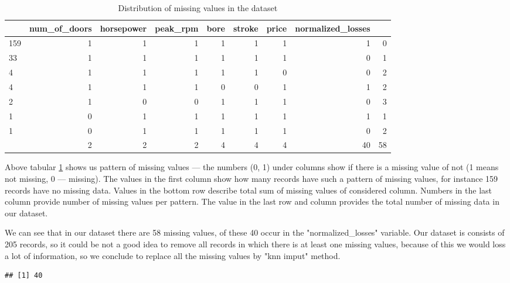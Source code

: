 \documentclass[11pt,a4paper]{article}\usepackage[]{graphicx}\usepackage[]{xcolor}
\makeatletter
\newenvironment{kframe}{%
 \def\at@end@of@kframe{}%
 \ifinner\ifhmode%
  \def\at@end@of@kframe{\end{minipage}}%
  \begin{minipage}{\columnwidth}%
 \fi\fi%
 \def\FrameCommand##1{\hskip\@totalleftmargin \hskip-\fboxsep
 \colorbox{shadecolor}{##1}\hskip-\fboxsep
     \hskip-\linewidth \hskip-\@totalleftmargin \hskip\columnwidth}%
 \MakeFramed {\advance\hsize-\width
   \@totalleftmargin\z@ \linewidth\hsize
   \@setminipage}}%
 {\par\unskip\endMakeFramed%
 \at@end@of@kframe}
\newenvironment{knitrout}{}{} %
\makeatother
\begin{document}
\begin{knitrout}
\color{fgcolor}\begin{table}

\caption{\label{tab:missing_value_distribution}Distribution of missing values in the dataset}
\centering
\begin{tabular}[t]{l|r|r|r|r|r|r|r|r}
\hline
  & num\_of\_doors & horsepower & peak\_rpm & bore & stroke & price & normalized\_losses & \\
\hline
159 & 1 & 1 & 1 & 1 & 1 & 1 & 1 & 0\\
\hline
33 & 1 & 1 & 1 & 1 & 1 & 1 & 0 & 1\\
\hline
4 & 1 & 1 & 1 & 1 & 1 & 0 & 0 & 2\\
\hline
4 & 1 & 1 & 1 & 0 & 0 & 1 & 1 & 2\\
\hline
2 & 1 & 0 & 0 & 1 & 1 & 1 & 0 & 3\\
\hline
1 & 0 & 1 & 1 & 1 & 1 & 1 & 1 & 1\\
\hline
1 & 0 & 1 & 1 & 1 & 1 & 1 & 0 & 2\\
\hline
 & 2 & 2 & 2 & 4 & 4 & 4 & 40 & 58\\
\hline
\end{tabular}
\end{table}

\end{knitrout}
	Above tabular \ref{tab:missing_value_distribution} shows us pattern of missing values --- the numbers (0, 1) under columns show if there is a missing value of not (1 means not missing, 0 --- missing). The values in the first column show how many records have such a pattern of missing values, for instance 159 records have no missing data. Values in the bottom row describe total sum of missing values of considered column. Numbers in the last column provide number of missing values per pattern. The value in the last row and column provides the total number of missing data in our dataset.
	
	We can see that in our dataset there are 58 missing values, of these 40 occur in the "normalized\_losses" variable. Our dataset is consists of 205 records, so it could be not a good idea to remove all records in which there is at least one missing values, because of this we would loss a lot of information, so we conclude to replace all the missing values by "knn imput" method. 
	
\begin{knitrout}
\color{fgcolor}\begin{kframe}
\begin{verbatim}
## [1] 40
\end{verbatim}
\end{kframe}
\end{knitrout}
	
\end{document}
